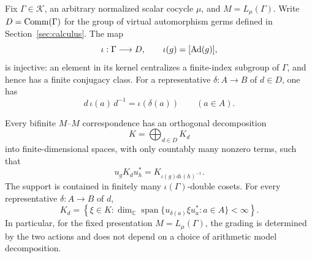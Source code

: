 Fix \(\Gamma\in\mathscr K\), an arbitrary normalized scalar cocycle
\(\mu\), and \(M=L_\mu(\Gamma)\).  Write
\(D=\operatorname{Comm}(\Gamma)\) for the group of virtual automorphism germs
defined in Section~\ref{sec:calculus}. The map
\[
 \iota:\Gamma\longrightarrow D,\qquad
 \iota(g)=[\operatorname{Ad}(g)],
\]
is injective: an element in its kernel centralizes a finite-index
subgroup of \(\Gamma\), and hence has a finite conjugacy class.
For a representative \(\delta:A\to B\) of \(d\in D\), one has
\begin{equation}
 d\,\iota(a)\,d^{-1}=\iota(\delta(a))\qquad(a\in A).
 \label{eq:endpoints-inner-germs}
\end{equation}

\begin{lemma}
\label{lem:endpoints-grading}
Every bifinite \(M\)--\(M\) correspondence has an orthogonal decomposition
\[
 K=\bigoplus_{d\in D}K_d
\]
into finite-dimensional spaces, with only countably many nonzero terms,
such that
\[
 u_gK_du_h^*=K_{\iota(g)d\iota(h)^{-1}}.
\]
The support is contained in finitely many \(\iota(\Gamma)\)-double
cosets.  For every representative \(\delta:A\to B\) of \(d\),
\begin{equation}
 K_d=\left\{\xi\in K:
  \dim_{\mathbb C}\operatorname{span}
    \{u_{\delta(a)}\xi u_a^*:a\in A\}<\infty\right\}.
 \label{eq:input-B1}
\end{equation}
In particular, for the fixed presentation $M=L_\mu(\Gamma)$, the
grading is determined by the two actions and does not depend on a
choice of arithmetic model decomposition.
\end{lemma}

